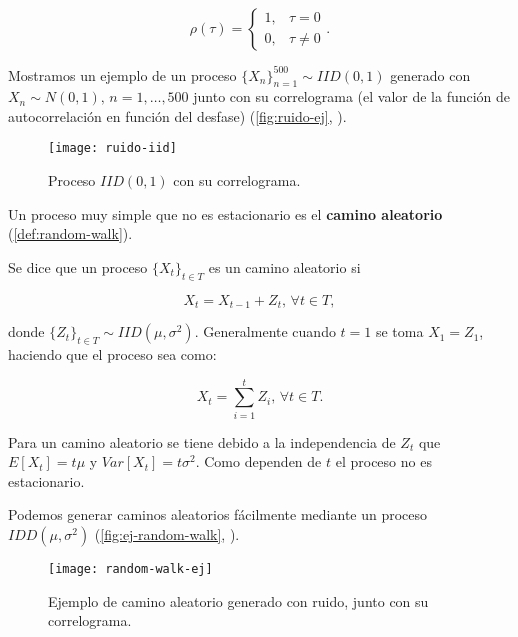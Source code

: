 \begin{equation}
  \rho(\tau) =
  \begin{cases}
    1, & \tau = 0 \\
    0, & \tau \neq 0
  \end{cases}.
  \label{eq:ruido-autocorrelacion}
\end{equation}

Mostramos un ejemplo de un proceso $\{X_n\}_{n = 1}^{500} \sim IID(0, 1)$ generado con $X_n \sim N(0, 1), \, n = 1, \ldots, 500$ junto con su correlograma (el valor de la función de autocorrelación en función del desfase) (\autoref{fig:ruido-ej}, \cite{chatfield2019analysis}).

\begin{figure}[htpb]
  \centering
  \texttt{[image: ruido-iid]}
  \caption{Proceso $IID(0, 1)$ con su correlograma.}
  \label{fig:ruido-ej}
\end{figure}

Un proceso muy simple que no es estacionario es el \textbf{camino aleatorio} (\autoref{def:random-walk}).

\begin{definicion}
  Se dice que un proceso $\{X_t\}_{t \in T}$ es un camino aleatorio si

  $$X_t = X_{t - 1} + Z_t, \, \forall t \in T,$$

  donde $\{Z_t\}_{t \in T} \sim IID(\mu , \sigma^2)$. Generalmente cuando $t = 1$ se toma $X_1 = Z_1$, haciendo que el proceso sea como:

  $$X_t = \sum \limits^t_{i = 1} Z_i, \, \forall t \in T.$$
  \label{def:random-walk}
\end{definicion}

Para un camino aleatorio se tiene debido a la independencia de $Z_t$ que $E[X_t] = t \mu$ y $Var[X_t] = t \sigma^2$. Como dependen de $t$ el proceso no es estacionario.

Podemos generar caminos aleatorios fácilmente mediante un proceso $IDD(\mu, \sigma^2)$ (\autoref{fig:ej-random-walk}, \cite{chatfield2019analysis}).

\begin{figure}[htpb]
  \centering
  \texttt{[image: random-walk-ej]}
  \caption{Ejemplo de camino aleatorio generado con ruido, junto con su correlograma.}
  \label{fig:ej-random-walk}
\end{figure}

